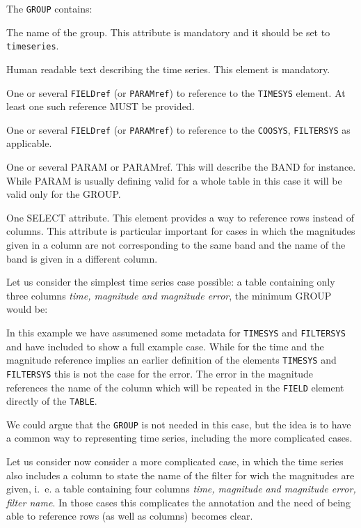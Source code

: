 \documentclass[11pt,a4paper]{ivoa}
\let\fg=\color
\def\elem#1{{\tt{\fg{DarkRed}#1}}}
\begin{document}
The \elem{GROUP} contains:
\begin{description}
     \item[\elem{name}] The name of the group. This attribute is mandatory and it should be set to \verb|timeseries|. 
     \item[\elem{DESCRIPTION}] Human readable text describing the time series. This element is mandatory. 
     \item[\elem{FIELDref}] One or several \elem{FIELDref} (or \elem{PARAMref}) to reference to the \elem{TIMESYS} element. At least one such reference MUST be provided.
     \item[\elem{FIELDref}] One or several \elem{FIELDref} (or \elem{PARAMref}) to reference to the \elem{COOSYS}, \elem{FILTERSYS} as applicable. 
     \item One or several PARAM or PARAMref. This will describe the BAND for instance. While PARAM is usually defining valid for a whole table in this case it will be valid only for the GROUP.  
     \item[\elem{SELECT}] One SELECT attribute. This element provides a way to reference rows instead of columns. This attribute is particular important for cases in which the magnitudes given in a column are not corresponding to the same band and the name of the band is given in a different column. 
\end{description}

Let us consider the simplest time series case possible: a table containing only three columns \emph{time, magnitude and magnitude error}, the minimum GROUP would be:

\begingroup

\endgroup

In this example we have assumened some metadata for \elem{TIMESYS} and \elem{FILTERSYS} and have included to show a full example case. While for the time and the magnitude reference implies an earlier definition of the elements \elem{TIMESYS} and \elem{FILTERSYS} this is not the case for the error. The error in the magnitude references the name of the column which will be repeated in the \elem{FIELD} element directly of the \elem{TABLE}.

We could argue that the \elem{GROUP} is not needed in this case, but the idea is to have a common way to representing time series, including the more complicated cases. 

\newpage 
Let us consider now consider a more complicated case, in which the time series also includes a column to state the name of the filter for wich the magnitudes are given, i.~e. a table containing four columns \emph{time, magnitude and magnitude error, filter name}. In those cases this complicates the annotation and the need of being able to reference rows (as well as columns) becomes clear.
\end{document}
